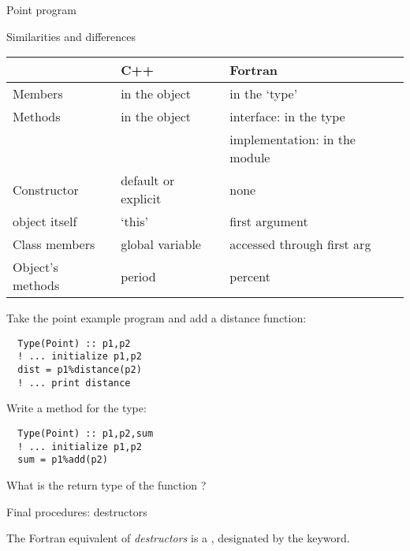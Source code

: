 \begin{block}{Point program}
  \label{sl:fpoint-program}
  \footnotesize
  
  \begin{multicols}{2}
    \columnbreak
  \end{multicols}  
\end{block}

\begin{block}{Similarities and differences}
  \label{sl:type-vs-class}
  \footnotesize
  \begin{tabular}{|l|ll|}
    \hline
    &C++&Fortran\\
    \hline
    Members&in the object&in the `type'\\
    Methods&in the object&interface: in the type\\
    &&implementation: in the module\\
    Constructor&default or explicit&none\\
    object itself&`this'&first argument\\
    Class members&global variable&accessed through first arg\\
    Object's methods&period&percent\\
    \hline
  \end{tabular}
\end{block}

\begin{exercise}
  \label{ex:fclass-point-distance}
  Take the point example program and add a distance function:
\begin{lstlisting}
  Type(Point) :: p1,p2
  ! ... initialize p1,p2
  dist = p1%distance(p2)
  ! ... print distance
\end{lstlisting}
\end{exercise}

\begin{exercise}
  \label{ex:fclass-translate}
  Write a method  for the  type:
\begin{lstlisting}
  Type(Point) :: p1,p2,sum
  ! ... initialize p1,p2
  sum = p1%add(p2)
\end{lstlisting}
  What is the return type of the function ?
\end{exercise}

 {Final procedures: destructors}

The Fortran equivalent of
\emph{destructors}
is a ,
designated by the  keyword.

